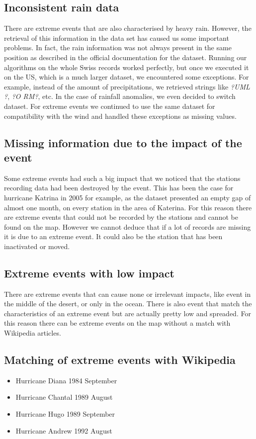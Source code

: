 \documentclass[12pt]{article}
\begin{document}
\subsection{Inconsistent rain data}
There are extreme events that are also characterised by heavy rain. However, the retrieval of this information in the data set has caused us some important problems. In fact, the rain information was not always present in the same position as described in the official documentation for the dataset. Running our algorithms on the whole Swiss records worked perfectly, but once we executed it on the US, which is a much larger dataset, we encountered some exceptions. For example, instead of the amount of precipitations, we retrieved strings like \textit{?UML ?}, \textit{?O RM?}, etc. In the case of rainfall anomalies,  we even decided to switch dataset. For extreme events we continued to use the same dataset for compatibility with the wind and handled these exceptions as missing values.

\subsection{Missing information due to the impact of the event}
Some extreme events had such a big impact that we noticed that the stations recording data had been destroyed by the event. This has been the case for hurricane Katrina in 2005 for example, as the dataset presented an empty gap of almost  one month, on every station in the area of Katerina. For this reason there are extreme events that could not be recorded by the stations and cannot be found on the map. However we cannot deduce that if a lot of records are missing it is due to an extreme event. It could also be the station that has been inactivated or moved.

\subsection{Extreme events with low impact}
There are extreme events that can cause none or irrelevant impacts, like event in the middle of the desert, or only in the ocean. There is also event that match the characteristics of an extreme event but are actually pretty low and spreaded. For this reason there can be extreme events on the map without a match with Wikipedia articles.


\subsection{Matching of extreme events with Wikipedia}
\begin{itemize}
\item Hurricane Diana 1984 September
\item Hurricane Chantal 1989 August
\item Hurricane Hugo 1989	September
\item Hurricane Andrew 1992 August
\end{itemize}
\end{document}
